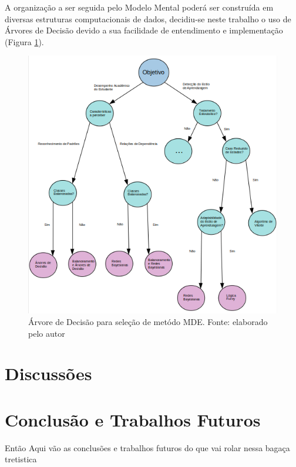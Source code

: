 \documentclass[12pt]{article}
\begin{document}
A organização a ser seguida pelo Modelo Mental poderá ser construída em diversas estruturas computacionais de dados, decidiu-se neste trabalho o uso de Árvores de Decisão devido a sua facilidade de entendimento e implementação (Figura \ref{arvoreDecisao}). 

\begin{figure}[H]
	\centering
	\includegraphics[scale=0.85]{figuras/ArvoreDecisao}
	\caption{Árvore de Decisão para seleção de metódo MDE. Fonte: elaborado pelo autor }
	\label{arvoreDecisao}	
\end{figure}

\section{Discussões}



\section{Conclusão e Trabalhos Futuros}
Então Aqui vão as conclusões e trabalhos futuros do que vai rolar nessa bagaça tretistica



\end{document}
